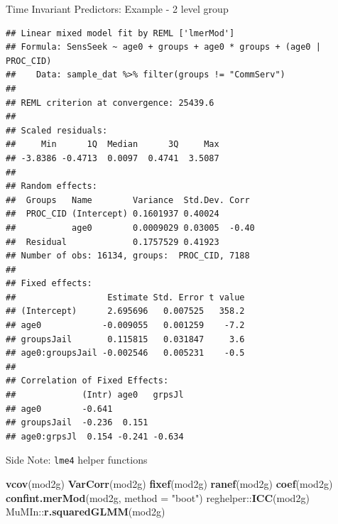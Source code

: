 \documentclass[ignorenonframetext,]{beamer}
\newenvironment{Shaded}{\begin{snugshade}}{\end{snugshade}}
\newcommand{\KeywordTok}[1]{\textcolor[rgb]{0.13,0.29,0.53}{\textbf{{#1}}}}
\newcommand{\DataTypeTok}[1]{\textcolor[rgb]{0.13,0.29,0.53}{{#1}}}
\newcommand{\StringTok}[1]{\textcolor[rgb]{0.31,0.60,0.02}{{#1}}}
\newcommand{\NormalTok}[1]{{#1}}
\begin{document}
\begin{frame}[fragile]{Time Invariant Predictors: Example - 2 level
group}

\tiny

\begin{Shaded}
\end{Shaded}

\tiny

\begin{verbatim}
## Linear mixed model fit by REML ['lmerMod']
## Formula: SensSeek ~ age0 + groups + age0 * groups + (age0 | PROC_CID)
##    Data: sample_dat %>% filter(groups != "CommServ")
## 
## REML criterion at convergence: 25439.6
## 
## Scaled residuals: 
##     Min      1Q  Median      3Q     Max 
## -3.8386 -0.4713  0.0097  0.4741  3.5087 
## 
## Random effects:
##  Groups   Name        Variance  Std.Dev. Corr 
##  PROC_CID (Intercept) 0.1601937 0.40024       
##           age0        0.0009029 0.03005  -0.40
##  Residual             0.1757529 0.41923       
## Number of obs: 16134, groups:  PROC_CID, 7188
## 
## Fixed effects:
##                  Estimate Std. Error t value
## (Intercept)      2.695696   0.007525   358.2
## age0            -0.009055   0.001259    -7.2
## groupsJail       0.115815   0.031847     3.6
## age0:groupsJail -0.002546   0.005231    -0.5
## 
## Correlation of Fixed Effects:
##             (Intr) age0   grpsJl
## age0        -0.641              
## groupsJail  -0.236  0.151       
## age0:grpsJl  0.154 -0.241 -0.634
\end{verbatim}

\normalsize

\end{frame}

\begin{frame}[fragile]{Side Note: \texttt{lme4} helper functions}

\begin{Shaded}
\begin{Highlighting}[]
\KeywordTok{vcov}\NormalTok{(mod2g)}
\KeywordTok{VarCorr}\NormalTok{(mod2g)}
\KeywordTok{fixef}\NormalTok{(mod2g)}
\KeywordTok{ranef}\NormalTok{(mod2g)}
\KeywordTok{coef}\NormalTok{(mod2g)}
\KeywordTok{confint.merMod}\NormalTok{(mod2g, }\DataTypeTok{method =} \StringTok{"boot"}\NormalTok{)}
\NormalTok{reghelper::}\KeywordTok{ICC}\NormalTok{(mod2g)}
\NormalTok{MuMIn::}\KeywordTok{r.squaredGLMM}\NormalTok{(mod2g)}
\end{Highlighting}
\end{Shaded}

\end{frame}
\end{document}
